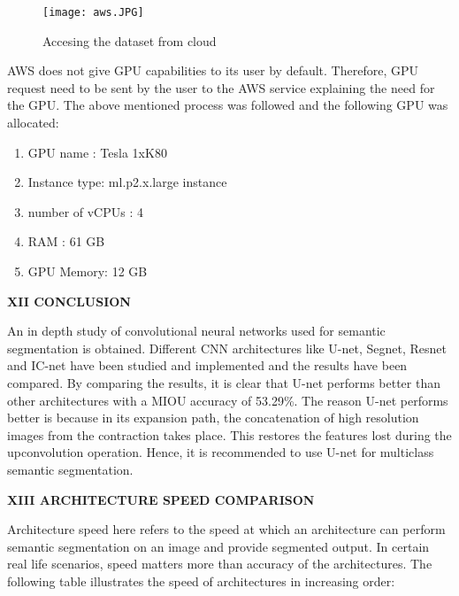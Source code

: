 \documentclass{IEEEtran}
\begin{document}
\begin{figure}[h]
    \centering
    \captionsetup{justification=centering}
    \texttt{[image: aws.JPG]}
    \caption{Accesing the dataset from cloud}
    \label{fig:Binary class segmented output}
\end{figure}

AWS does not give GPU capabilities to its user by default. Therefore, GPU request need to be sent by the user to the AWS service explaining the need for the GPU. The above mentioned process was followed and the following GPU was allocated:
\begin{enumerate}
    \item GPU name : Tesla 1xK80
    \item Instance type: ml.p2.x.large instance
    \item number of vCPUs : 4
    \item RAM : 61 GB
    \item GPU Memory: 12 GB
\end{enumerate}

\begin{center}
\textbf{XII CONCLUSION}    
\end{center}
An in depth study of convolutional neural networks used for semantic segmentation is obtained. Different CNN architectures like U-net, Segnet, Resnet and IC-net have been studied and implemented and the results have been compared. By comparing the results, it is clear that U-net performs better than other architectures with a MIOU accuracy of 53.29\%. The reason U-net performs better is because in its expansion path, the concatenation of high resolution images from the contraction takes place. This restores the features lost during the upconvolution operation. Hence, it is recommended to use U-net for multiclass semantic segmentation.

\begin{center}
\textbf{XIII ARCHITECTURE SPEED COMPARISON}
\end{center}
Architecture speed here refers to the speed at which an architecture can perform semantic segmentation on an image and provide segmented output. In certain real life scenarios, speed matters more than accuracy of the architectures. The following table illustrates the speed of architectures in increasing order:
\\
\end{document}
